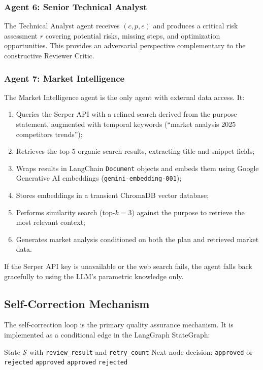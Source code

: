 \documentclass[journal]{IEEEtran}
\begin{document}
\subsubsection{Agent 6: Senior Technical Analyst}
The Technical Analyst agent receives $(c, p, e)$ and produces a critical risk assessment $r$ covering potential risks, missing steps, and optimization opportunities. This provides an adversarial perspective complementary to the constructive Reviewer Critic.

\subsubsection{Agent 7: Market Intelligence}
The Market Intelligence agent is the only agent with external data access. It:
\begin{enumerate}
    \item Queries the Serper API with a refined search derived from the purpose statement, augmented with temporal keywords (``market analysis 2025 competitors trends'');
    \item Retrieves the top 5 organic search results, extracting title and snippet fields;
    \item Wraps results in LangChain \texttt{Document} objects and embeds them using Google Generative AI embeddings (\texttt{gemini-embedding-001});
    \item Stores embeddings in a transient ChromaDB vector database;
    \item Performs similarity search (top-$k=3$) against the purpose to retrieve the most relevant context;
    \item Generates market analysis conditioned on both the plan and retrieved market data.
\end{enumerate}

If the Serper API key is unavailable or the web search fails, the agent falls back gracefully to using the LLM's parametric knowledge only.

\subsection{Self-Correction Mechanism}

The self-correction loop is the primary quality assurance mechanism. It is implemented as a conditional edge in the LangGraph StateGraph:

\begin{algorithm}[H]
\caption{Self-Correction Decision Function}
\label{alg:selfcorrect}
\begin{algorithmic}[1]
\REQUIRE State $\mathcal{S}$ with \texttt{review\_result} and \texttt{retry\_count}
\ENSURE Next node decision: \texttt{approved} or \texttt{rejected}
    \RETURN \texttt{approved}
    \RETURN \texttt{approved} 
\ELSE
    \RETURN \texttt{rejected} 
\ENDIF
\end{algorithmic}
\end{algorithm}
\end{document}
